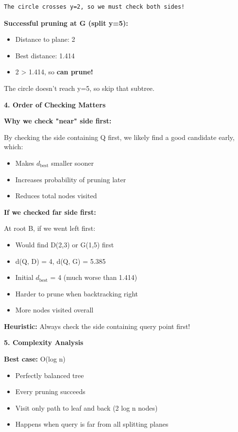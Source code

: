 \documentclass[12pt]{article}
\begin{document}
\begin{explanation}
\begin{verbatim}
The circle crosses y=2, so we must check both sides!
\end{verbatim}

\textbf{Successful pruning at G (split y=5):}
\begin{itemize}
    \item Distance to plane: 2
    \item Best distance: 1.414
    \item 2 > 1.414, so \textbf{can prune!}
\end{itemize}

The circle doesn't reach y=5, so skip that subtree.

\textbf{4. Order of Checking Matters}

\textbf{Why we check "near" side first:}

By checking the side containing Q first, we likely find a good candidate early, which:
\begin{itemize}
    \item Makes $d_{\text{best}}$ smaller sooner
    \item Increases probability of pruning later
    \item Reduces total nodes visited
\end{itemize}

\textbf{If we checked far side first:}

At root B, if we went left first:
\begin{itemize}
    \item Would find D(2,3) or G(1,5) first
    \item d(Q, D) = 4, d(Q, G) = 5.385
    \item Initial $d_{\text{best}}$ = 4 (much worse than 1.414)
    \item Harder to prune when backtracking right
    \item More nodes visited overall
\end{itemize}

\textbf{Heuristic:} Always check the side containing query point first!

\textbf{5. Complexity Analysis}

\textbf{Best case:} O(log n)
\begin{itemize}
    \item Perfectly balanced tree
    \item Every pruning succeeds
    \item Visit only path to leaf and back (2 log n nodes)
    \item Happens when query is far from all splitting planes
\end{itemize}


\end{explanation}
\end{document}
